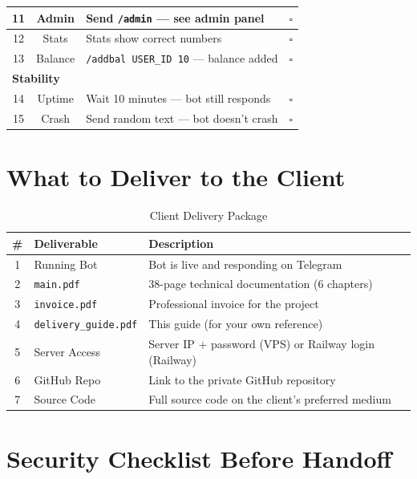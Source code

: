 \begin{table}[H]
\begin{tabularx}{\textwidth}{|c|c|X|c|}
\hline
11 & Admin & Send \texttt{/admin} --- see admin panel & $\square$ \\
\hline
12 & Stats & Stats show correct numbers & $\square$ \\
\hline
13 & Balance & \texttt{/addbal USER\_ID 10} --- balance added & $\square$ \\
\hline
\multicolumn{4}{|l|}{\cellcolor{brandLight}\textbf{Stability}} \\
\hline
14 & Uptime & Wait 10 minutes --- bot still responds & $\square$ \\
\hline
15 & Crash & Send random text --- bot doesn't crash & $\square$ \\
\hline
\end{tabularx}
\end{table}

\section{What to Deliver to the Client}

\begin{table}[H]
\centering
\caption{Client Delivery Package}
\begin{tabularx}{\textwidth}{|c|l|X|}
\hline
\textbf{\#} & \textbf{Deliverable} & \textbf{Description} \\
\hline
1 & Running Bot & Bot is live and responding on Telegram \\
\hline
2 & \texttt{main.pdf} & 38-page technical documentation (6 chapters) \\
\hline
3 & \texttt{invoice.pdf} & Professional invoice for the project \\
\hline
4 & \texttt{delivery\_guide.pdf} & This guide (for your own reference) \\
\hline
5 & Server Access & Server IP + password (VPS) or Railway login (Railway) \\
\hline
6 & GitHub Repo & Link to the private GitHub repository \\
\hline
7 & Source Code & Full source code on the client's preferred medium \\
\hline
\end{tabularx}
\end{table}

\section{Security Checklist Before Handoff}

